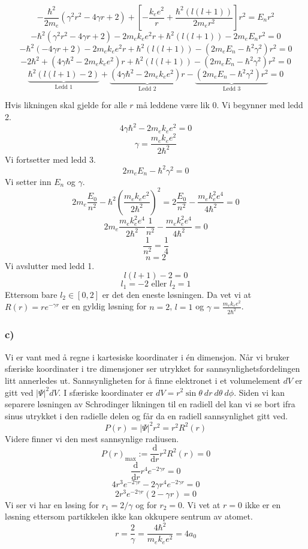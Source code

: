 \documentclass[norsk]{article}
\begin{document}
\[
- \frac{ℏ^2}{2 m_e}\left(γ^2r^2 - 4γr + 2\right) + \left[- \frac{k_ee^2}{r} + \frac{ℏ^2(l(l+1))}{2 m_e r^2}\right]r^2 = E_nr^2
\]
\[
- ℏ^2\left(γ^2r^2 - 4γr + 2\right)  -  2 m_ek_ee^2r + ℏ^2(l(l+1)) - 2 m_eE_nr^2 = 0 
\]
\[
-ℏ^2(-4γr+2) - 2 m_e k_ee^2r + ℏ^2(l(l+1)) - \left(2 m_e E_n - ℏ^2γ^2\right)r^2 = 0
\]
\[
-2ℏ^2  + (4γℏ^2 - 2 m_e k_ee^2)r + ℏ^2(l(l+1)) - \left(2 m_e E_n - ℏ^2γ^2\right)r^2 = 0
\]
\[
\underbrace{ℏ^2(l(l+1) - 2)}_{\text{Ledd 1}} + \underbrace{(4γℏ^2 - 2 m_e k_ee^2)r}_{\text{Ledd 2}} - \underbrace{\left(2 m_e E_n - ℏ^2γ^2\right)r^2}_{\text{Ledd 3}} = 0
\]


Hvis likningen skal gjelde for alle $r$ må leddene være lik 0. Vi begynner med ledd 2. 
\[
4γℏ^2 - 2 m_e k_ee^2 = 0
\]
\[
γ = \frac{m_e k_ee^2}{2ℏ^2}
\]
Vi fortsetter med ledd 3. 
\[
2 m_e E_n - ℏ^2γ^2 = 0
\]
Vi setter inn $E_n$ og $γ$. 
\[
2 m_e \frac{E_0}{n^2} - ℏ^2\left(\frac{m_e k_ee^2}{2ℏ^2}\right)^2 = 2 \frac{E_0}{n^2} - \frac{m_e k_e^2e^4}{4ℏ^2} = 0
\]
\[
2 m_e \frac{m_ek_e^2e^4 }{2ℏ^2} \frac{1}{n^2} - \frac{m_e k_e^2e^4}{4ℏ^2} = 0
\]
\[
\frac{1}{n^2} = \frac{1}{4}
\]
\[
n = 2
\]
Vi avslutter med ledd 1.
\[
l(l+1) - 2 = 0
\] 
\[
l_1 = -2 \text{ eller } l_2 = 1
\]
Ettersom bare $l_2 ∈ [0,2]$ er det den eneste løsningen. Da vet vi at $R(r) = re^{-γr}$ er en gyldig løsning for $n = 2$, $l = 1$ og $\displaystyle γ = \frac{m_e k_ee^2}{2ℏ^2}$. 

\subsubsection*{c)}
Vi er vant med å regne i kartesiske koordinater i én dimensjon. Når vi bruker sfæriske koordinater i tre dimensjoner ser utrykket for sannsynlighetsfordelingen litt annerledes ut. Sannsynligheten for å finne elektronet i et volumelement $dV$ er gitt ved $\left|Ψ\right|^2 dV$. I sfæriske koordinater er $dV = r^2 \sin θ\ dr\ dθ\ dϕ$. Siden vi kan separere løsningen av Schrodinger likningen til en radiell del kan vi se bort ifra sinus utrykket i den radielle delen og får da en radiell sannsynlighet gitt ved. 
\[
P(r) =  \left|Ψ\right|^2 r^2 = r^2 R^2(r)
\]
Videre finner vi den mest sannsynlige radiusen. 
\[
P(r)_{\text{max}} := \frac{\mathrm{d}}{\mathrm{d}r} r^2 R^2(r) = 0
\]
\[
\frac{\mathrm{d}}{\mathrm{d}r} r^4 e^{-2γr} = 0
\]
\[
4r^3e^{-2γr} - 2γr^4e^{-2γr} = 0
\]
\[
2r^3e^{-2γr}\left(2 - γr\right) = 0
\]
Vi ser vi har en løsing for $r_1 = 2 / γ$ og for $r_2 = 0$. Vi vet at $r=0$ ikke er en løsning ettersom partikkelen ikke kan okkupere sentrum av atomet. 
\[
r = \frac{2}{γ} = \frac{4ℏ^2}{m_e k_ee^2} = 4a_0
\]
\end{document}
